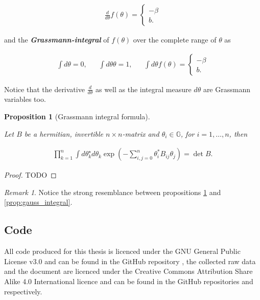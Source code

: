 \documentclass{article}
\theoremstyle{plain} %
\newtheorem{prop}[theorem]{Proposition}
\theoremstyle{convention} %
\theoremstyle{remark} %
\newtheorem*{remark}{Remark} %
\newcommand\listofproposals{\tcblistof[\subsection]{pp}{List of Proposals}}
\def\df#1{\textbf{\textit{#1}}}
\numberwithin{equation}{section}
\begin{document}
\begin{appendix}
\begin{align*}
  \frac{d}{d \theta} f(\theta) = \left\{
      \begin{array}{ll}
          -\beta \\
          b.
      \end{array}
  \right.
\end{align*}

and the \df{Grassmann-integral} of $f(\theta)$ over the complete range of $\theta$ as

\begin{align*}
  \int d \theta = 0, &&\int d \theta \theta = 1, &&\int d \theta f(\theta) = \left\{
      \begin{array}{ll}
          -\beta \\
          b.
      \end{array}
  \right.
\end{align*}

Notice that the derivative $\frac{d}{d \theta}$ as well as the integral measure $d \theta$ are Grassmann variables too.

\begin{prop}[Grassmann integral formula]

\label{prop:grassmann_integral}

Let $B$ be a hermitian, invertible $n \times n$-matrix and $\theta_i \in \mathbb{G}$, for $i = 1, \dots, n$, then

\begin{align*}
  \prod_{k=1}^n \int d \theta_k^{\star} d \theta_k \exp( - \sum_{i,j=0}^n \theta_i^{*} B_{ij} \theta_j ) = \det B.
\end{align*}

\end{prop}

\begin{proof}

TODO

\end{proof}

\begin{remark}
  Notice the strong resemblance between propositions \ref{prop:grassmann_integral} and \ref{prop:gauss_integral}.
\end{remark}

\subsection{Code}
\label{sec:code}

All code produced for this thesis is licenced under the GNU General Public License v3.0 and can be found in the GitHub repository \cite{github_code}, the collected raw data and the document are licenced under the Creative Commons Attribution Share Alike 4.0 International licence and can be found in the GitHub repositories \cite{github_data} and \cite{github_doc} respectively.

\listofproposals

\end{appendix}

\printglossary[type=\acronymtype]

\printglossary
\end{document}
